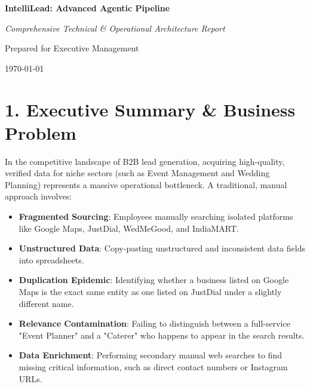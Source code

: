 \documentclass[12pt,a4paper]{article}
\begin{document}
\begin{titlepage}
    \centering
    \vspace*{2cm}
    
    {\Huge\bfseries\color{primary} IntelliLead: Advanced Agentic Pipeline \par}
    \vspace{1cm}
    {\Large\itshape Comprehensive Technical & Operational Architecture Report \par}
    \vspace{2cm}
    
    {\Large Prepared for Executive Management \par}
    \vspace{3cm}
    
    \vfill
    
    {\large \today \par}
\end{titlepage}

\tableofcontents
\newpage

\section{1. Executive Summary & Business Problem}

In the competitive landscape of B2B lead generation, acquiring high-quality, verified data for niche sectors (such as Event Management and Wedding Planning) represents a massive operational bottleneck. A traditional, manual approach involves:

\begin{itemize}
    \item \textbf{Fragmented Sourcing}: Employees manually searching isolated platforms like Google Maps, JustDial, WedMeGood, and IndiaMART.
    \item \textbf{Unstructured Data}: Copy-pasting unstructured and inconsistent data fields into spreadsheets.
    \item \textbf{Duplication Epidemic}: Identifying whether a business listed on Google Maps is the exact same entity as one listed on JustDial under a slightly different name.
    \item \textbf{Relevance Contamination}: Failing to distinguish between a full-service "Event Planner" and a "Caterer" who happens to appear in the search results.
    \item \textbf{Data Enrichment}: Performing secondary manual web searches to find missing critical information, such as direct contact numbers or Instagram URLs.
\end{itemize}
\end{document}

